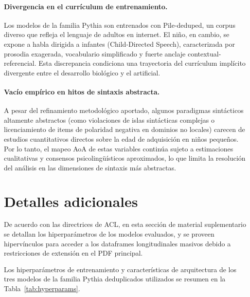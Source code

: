 \documentclass[11pt]{article}
\begin{document}
\paragraph{Divergencia en el currículum de entrenamiento.} Los modelos de la familia Pythia son entrenados con Pile-deduped, un corpus diverso que refleja el lenguaje de adultos en internet. El niño, en cambio, se expone a habla dirigida a infantes (Child-Directed Speech), caracterizada por prosodia exagerada, vocabulario simplificado y fuerte anclaje contextual-referencial. Esta discrepancia condiciona una trayectoria del currículum implícito divergente entre el desarrollo biológico y el artificial.

\paragraph{Vacío empírico en hitos de sintaxis abstracta.} A pesar del refinamiento metodológico aportado, algunos paradigmas sintácticos altamente abstractos (como violaciones de islas sintácticas complejas o licenciamiento de items de polaridad negativa en dominios no locales) carecen de estudios cuantitativos directos sobre la edad de adquisición en niños pequeños. Por lo tanto, el mapeo AoA de estas variables continúa sujeto a estimaciones cualitativas y consensos psicolingüísticos aproximados, lo que limita la resolución del análisis en las dimensiones de sintaxis más abstractas.



\appendix

\section{Detalles adicionales}
\label{sec:apendice}

De acuerdo con las directrices de ACL, en esta sección de material suplementario se detallan los hiperparámetros de los modelos evaluados, y se proveen hipervínculos para acceder a los dataframes longitudinales masivos debido a restricciones de extensión en el PDF principal.

Los hiperparámetros de entrenamiento y características de arquitectura de los tres modelos de la familia Pythia deduplicados utilizados se resumen en la Tabla~\ref{tab:hyperparams}.
\end{document}
